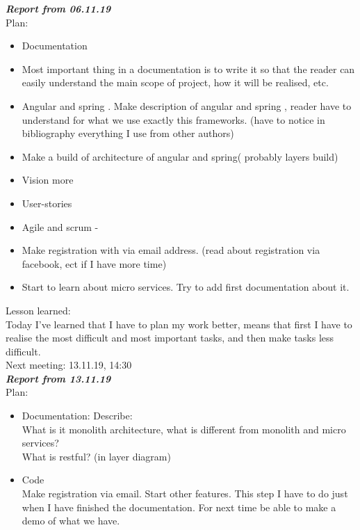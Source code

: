\documentclass{scrartcl}
\begin{document}
\textbf{\textit{Report from 06.11.19}}\\
Plan:\\
\begin{itemize}


	\item	Documentation
	\item	Most important thing in a documentation is to write it so that the reader can easily understand the main scope of project, how it will be realised, etc.  
	\item	Angular and spring . Make description of angular and spring , reader have to understand for what we use exactly this frameworks. (have to notice in bibliography everything I use from other authors)
	\item	Make a build of architecture of angular and spring( probably layers build)
	\item	Vision more
	\item	User-stories
	\item	Agile and scrum -\/
	\item	Make registration with via email address. (read about registration via facebook, ect if I have more time)
	\item	 Start to learn about micro services. Try to add first documentation about it. 
\end{itemize}
Lesson learned:\\
Today I’ve learned that I have to plan my work better, means that first I have to realise the most difficult and most important tasks, and then make tasks less difficult. \\
 
Next meeting: 13.11.19, 14:30\\





\textbf{\textit{Report from 13.11.19}}\\

Plan:\\
\begin{itemize}
	\item	Documentation: 
Describe:\\
        What is it monolith architecture, what is different from monolith and micro services?\\
       What is restful? (in layer diagram)\\
	\item	Code \\
Make registration via email. Start other features. This step I have to do just when I have finished the documentation.
For next time be able to make a demo of what we have.
\end{itemize}
\end{document}
